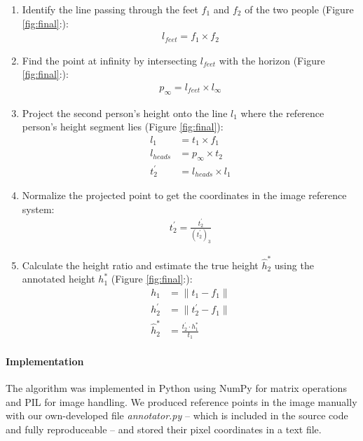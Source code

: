 \begin{enumerate}
    \item Identify the line passing through the feet $f_1$ and $f_2$ of the two people (Figure \ref{fig:final}:):
    \begin{align*}
        l_{feet} = f_{1} \times f_{2}
    \end{align*}
    
    \item Find the point at infinity by intersecting $l_{feet}$ with the horizon (Figure \ref{fig:final}:):
    \begin{align*}
        p_{\infty} = l_{feet} \times l_{\infty}
    \end{align*}

    \item Project the second person's height onto the line $l_1$ where the reference person's height segment lies (Figure \ref{fig:final}):
    \begin{align*}
        l_{1} &= t_1 \times f_1 \\
        l_{heads} &= p_{\infty} \times t_2 \\
        t_2^{\prime} &= l_{heads} \times l_{1}
    \end{align*}

    \item Normalize the projected point to get the coordinates in the image reference system:
    \begin{align*}
        t_2^{\prime} = \frac{t_2^{\prime}}{(t_2^{\prime})_3}
    \end{align*}

    \item Calculate the height ratio and estimate the true height $\hat{h}^*_2$ using the annotated height $h^*_1$ (Figure \ref{fig:final}:):
    \begin{align*}
        h_1 &= \|t_1 - f_1\| \\
        h_2^{\prime} &= \|t_2^{\prime} - f_1\| \\
        \hat{h}^*_2 &= \frac{t_2^{\prime} \cdot h^*_1}{t_1}
    \end{align*}
    
\end{enumerate}

\paragraph{Implementation} The algorithm was implemented in Python using NumPy for matrix operations and PIL for image handling. We produced reference points in the image manually with our own-developed file \textit{annotator.py} – which is included in the source code and fully reproduceable – and stored their pixel coordinates in a text file.

